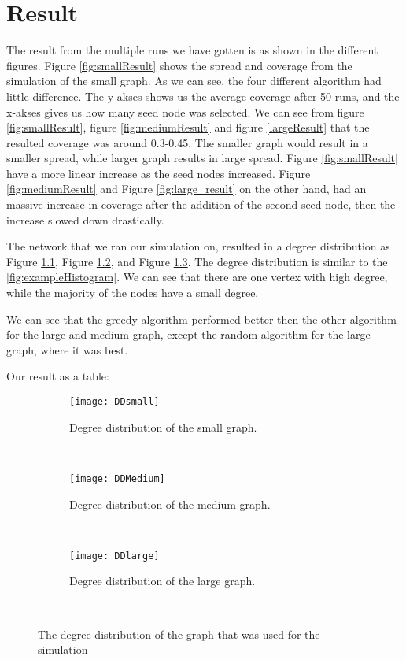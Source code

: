 \chapter{Result}
The result from the multiple runs we have gotten is as shown in the different figures. Figure \ref{fig:smallResult} shows the spread and coverage from the simulation of the small graph. As we can see, the four different algorithm had little difference. The y-akses shows us the average coverage after 50 runs, and the x-akses gives us how many seed node was selected. We can see from figure \ref{fig:smallResult}, figure \ref{fig:mediumResult} and figure \ref{largeResult} that the resulted coverage was around 0.3-0.45. The smaller graph would result in a smaller spread, while larger graph results in large spread. Figure \ref{fig:smallResult} have a more linear increase as the seed nodes increased. Figure \ref{fig:mediumResult} and Figure \ref{fig:large_result} on the other hand, had an massive increase in coverage after the addition of the second seed node, then the increase slowed down drastically. 

The network that we ran our simulation on, resulted in a degree distribution as Figure \ref{fig:smallDegree}, Figure \ref{fig:mediumDegree}, and Figure \ref{fig:largeDegree}. The degree distribution is similar to the \ref{fig:exampleHistogram}. We can see that there are one vertex with high degree, while the majority of the nodes have a small degree. 


We can see that the greedy algorithm performed better then the other algorithm for the large and medium graph, except the random algorithm for the large graph, where it was best.


Our result as a table:

\begin{figure}[h]
\begin{subfigure}{0.3\textwidth}
	\texttt{[image: DDsmall]}
	\caption{Degree distribution of the small graph.}
	\label{fig:smallDegree}
\end{subfigure}
~
\begin{subfigure}{0.3\textwidth}
	\texttt{[image: DDMedium]}
	\caption{Degree distribution of the medium graph.}
	\label{fig:mediumDegree}
\end{subfigure}
~
\begin{subfigure}{0.3\textwidth}
	\texttt{[image: DDlarge]}
	\caption{Degree distribution of the large graph.}
	\label{fig:largeDegree}
\end{subfigure}
~
\caption{The degree distribution of the graph that was used for the simulation}
\label{fig:histogram}
\end{figure}


